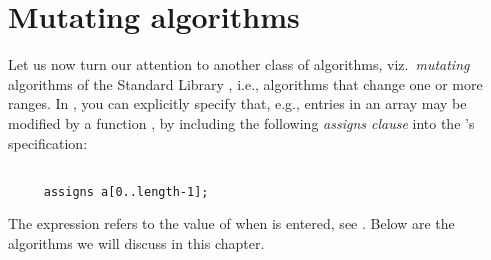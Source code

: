 
\chapter{Mutating algorithms} 

Let us now turn our attention to another class of algorithms,
viz.\ \emph{mutating} algorithms of the \cxx Standard Library \cite[\S
28.6]{cxx-17-draft}, i.e.,
algorithms that change one or more ranges.
%
In \framac, you can explicitly specify that, e.g., entries in an array
 may be modified by a function
,
by including the following \emph{assigns clause} into the 
's specification:

\begin{lstlisting}[style=acsl-block]

     assigns a[0..length-1];
\end{lstlisting} %
The expression  refers to the value of 
when  is entered, see 
\cite[\S2.3.2]{ACSLSpec}.
Below are the algorithms we will discuss in this chapter.

